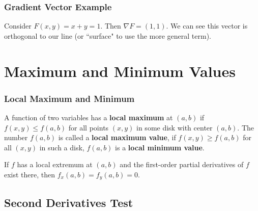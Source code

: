 \documentclass{beamer}
\begin{document}
\begin{frame}
\frametitle{Gradient Vector Example}

Consider $F(x, y) = x + y = 1$. Then $\nabla F = (1, 1)$. We can see this vector is orthogonal to our line (or ``surface" to use the more general term).
\begin{center}
\end{center}
\end{frame}


\section{Maximum and Minimum Values}

\begin{frame}
\frametitle{Local Maximum and Minimum}

\begin{Definition}
A function of two variables has a {\bf local maximum} at $(a, b)$ if $f(x, y)\leq f(a, b)$ for all points $(x, y)$ in some disk with center $(a, b)$. The number $f(a, b)$ is called a {\bf local maximum value}, if $f(x, y) \geq f(a, b)$ for all $(x, y)$ in such a disk, $f(a, b)$ is a {\bf local minimum value}.
\end{Definition}

\begin{Theorem}
If $f$ has a local extremum at $(a, b)$ and the first-order partial derivatives of $f$ exist there, then $f_x(a, b) = f_y(a, b) = 0$.
\end{Theorem}

\end{frame}

\subsection{Second Derivatives Test}
\end{document}
